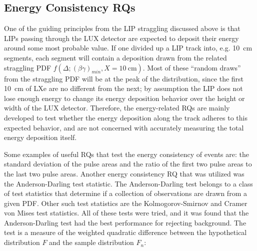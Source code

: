 \subsection{Energy Consistency RQs}
One of the guiding principles from the \ac{LIP} straggling discussed above is that \ac{LIP}s passing through the \ac{LUX} detector are expected to deposit their energy around some most probable value. If one divided up a \ac{LIP} track into, e.g. 10~cm segments, each segment will contain a deposition drawn from the related straggling \ac{PDF} $f(\Delta; (\beta \gamma)_{min}, X=10~\mathrm{cm})$. Most of these ``random draws'' from the straggling \ac{PDF} will be at the peak of the distribution, since the first 10~cm of \ac{LXe} are no different from the next; by assumption the \ac{LIP} does not lose enough energy to change its energy deposition behavior over the height or width of the \ac{LUX} detector. Therefore, the energy-related \ac{RQ}s are mainly developed to test whether the energy deposition along the track adheres to this expected behavior, and are not concerned with accurately measuring the total energy deposition itself. 

Some examples of useful \ac{RQ}s that test the energy consistency of events are: the standard deviation of the pulse areas and the ratio of the first two pulse areas to the last two pulse areas. Another energy consistency \ac{RQ} that was utilized was the Anderson-Darling test statistic. The Anderson-Darling test belongs to a class of test statistics that determine if a collection of observations are drawn from a given \ac{PDF}. Other such test statistics are the Kolmogorov-Smirnov and Cramer von Mises test statistics. All of these tests were tried, and it was found that the Anderson-Darling test had the best performance for rejecting background. The test is a measure of the weighted quadratic difference between the hypothetical distribution $F$ and the sample distribution $F_{n}$:

